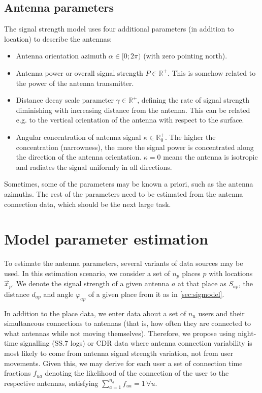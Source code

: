 \documentclass[a4paper]{article}
\begin{document}
\subsection{Antenna parameters}
The signal strength model uses four additional parameters (in addition to
location) to describe the antennas:
\begin{itemize}
\item Antenna orientation azimuth $\alpha \in [0;2\pi)$ (with zero pointing
    north).
\item Antenna power or overall signal strength $P \in \mathbb{R}^{+}$. This
    is somehow related to the power of the antenna transmitter.
\item Distance decay scale parameter $\gamma \in \mathbb{R}^{+}$, defining
    the rate of signal strength diminishing with increasing distance from the
    antenna. This can be related e.g. to the vertical orientation of the
    antenna with respect to the surface.
\item Angular concentration of antenna signal $\kappa \in \mathbb{R}^{+}_{0}$.
    The higher the concentration (narrowness), the more the signal power is
    concentrated along the direction of the antenna orientation. $\kappa = 0$
    means the antenna is isotropic and radiates the signal uniformly in all
    directions.
\end{itemize}
Sometimes, some of the parameters may be known a priori, such as the antenna
azimuths. The rest of the parameters need to be estimated from the antenna
connection data, which should be the next large task.



\section{Model parameter estimation}
To estimate the antenna parameters, several variants of data sources may be
used. In this estimation scenario, we consider a set of $n_p$ places $p$ with
locations $\vec{x}_p$. We denote the signal strength of a given antenna
$a$ at that place as $S_{ap}$, the distance $d_{ap}$ and angle $\varphi_{ap}$
of a given place from it as in \ref{sec:sigmodel}.

In addition to the place data, we enter data about a set of $n_u$ users and
their simultaneous connections to antennas (that is, how often they are
connected to what antennas while not moving themselves).
Therefore, we propose using night-time signalling (SS.7 logs) or CDR
data where antenna connection variability is most likely to come from antenna
signal strength variation, not from user movements. Given this, we may derive
for each user a set of connection time fractions $f_{ua}$ denoting the
likelihood of the connection of the user to the respective antennas, satisfying
$\sum_{a=1}^{n_a} f_{ua} = 1 \,\forall u$.
\end{document}
